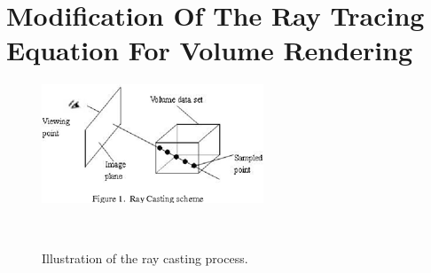 \section{Modification Of The Ray Tracing Equation For Volume Rendering}



\begin{figure}[htb]
  \centering
  \includegraphics[width=.8\linewidth]{RayCasting1.png}
  \parbox[t]{.9\columnwidth}{\relax }~\cite{Appa2015RayCF}
  \caption{\label{fig:firstExample}
          Illustration of the ray casting process.}
\end{figure}








% 
%       




